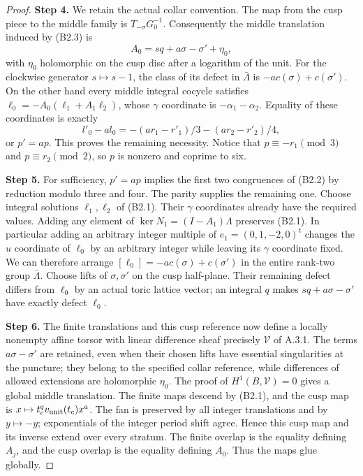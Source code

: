 \documentclass[11pt,a4paper]{article}
\theoremstyle{plain}
\theoremstyle{definition}
\begin{document}
\begin{proof}
\par\smallskip\noindent\textbf{Step 4.} We retain the actual collar convention. The map from the cusp piece to the middle family is $T_{-\sigma}G_0^{-1}$. Consequently the middle translation induced by (B2.3) is
\[
 A_0=sq+a\sigma-\sigma'+\eta_0,
\]
with $\eta_0$ holomorphic on the cusp disc after a logarithm of the unit. For the clockwise generator $s\mapsto s-1$, the class of its defect in $\bar\Lambda$ is $-a c(\sigma)+c(\sigma')$. On the other hand every middle integral cocycle satisfies
$\ell_0=-A_0(\ell_1+A_1\ell_2)$, whose $\gamma$ coordinate is $-\alpha_1-\alpha_2$. Equality of these coordinates is exactly
\[
 l'_0-a l_0=-(ar_1-r'_1)/3-(ar_2-r'_2)/4,
\]
or $p'=ap$. This proves the remaining necessity. Notice that $p\equiv-r_1\pmod3$ and $p\equiv r_2\pmod2$, so $p$ is nonzero and coprime to six.

\par\smallskip\noindent\textbf{Step 5.} For sufficiency, $p'=ap$ implies the first two congruences of (B2.2) by reduction modulo three and four. The parity supplies the remaining one. Choose integral solutions $\ell_1,\ell_2$ of (B2.1). Their $\gamma$ coordinates already have the required values. Adding any element of $\ker N_1=(I-A_1)\Lambda$ preserves (B2.1). In particular adding an arbitrary integer multiple of $e_1=(0,1,-2,0)^t$ changes the $\widehat u$ coordinate of $\ell_0$ by an arbitrary integer while leaving its $\gamma$ coordinate fixed. We can therefore arrange
$[\ell_0]=-a c(\sigma)+c(\sigma')$ in the entire rank-two group $\bar\Lambda$. Choose lifts of $\sigma,\sigma'$ on the cusp half-plane. Their remaining defect differs from $\ell_0$ by an actual toric lattice vector; an integral $q$ makes $sq+a\sigma-\sigma'$ have exactly defect $\ell_0$.

\par\smallskip\noindent\textbf{Step 6.} The finite translations and this cusp reference now define a locally nonempty affine torsor with linear difference sheaf precisely $\mathcal V$ of A.3.1. The terms $a\sigma-\sigma'$ are retained, even when their chosen lifts have essential singularities at the puncture; they belong to the specified collar reference, while differences of allowed extensions are holomorphic $\eta_0$. The proof of $H^1(B,\mathcal V)=0$ gives a global middle translation. The finite maps descend by (B2.1), and the cusp map is $x\mapsto t_c^qv_{\rm unit}(t_c)x^a$. The fan is preserved by all integer translations and by $y\mapsto-y$; exponentials of the integer period shift agree. Hence this cusp map and its inverse extend over every stratum. The finite overlap is the equality defining $A_j$, and the cusp overlap is the equality defining $A_0$. Thus the maps glue globally.


\end{proof}
\end{document}

